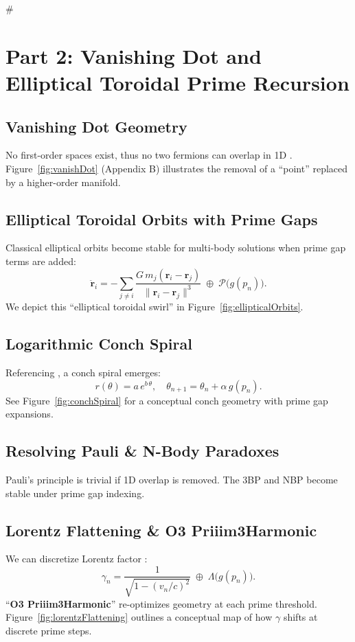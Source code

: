 #  \documentclass[11pt]{article}
\begin{document}
\section{Part 2: Vanishing Dot and Elliptical Toroidal Prime Recursion}
\label{part2}

\subsection{Vanishing Dot Geometry}
No first-order spaces exist, thus no two fermions can overlap in 1D \cite{Pauli1925}. Figure~\ref{fig:vanishDot} (Appendix B) illustrates the removal of a “point” replaced by a higher-order manifold.

\subsection{Elliptical Toroidal Orbits with Prime Gaps}
Classical elliptical orbits \cite{Newton1687} become stable for multi-body solutions when prime gap terms are added:
\[
\ddot{\mathbf{r}}_i 
= -\sum_{j \neq i} \frac{G\,m_j (\mathbf{r}_i - \mathbf{r}_j)}{\|\mathbf{r}_i - \mathbf{r}_j\|^3}
\;\oplus\;
\mathcal{P}\bigl(g(p_n)\bigr).
\]
We depict this “elliptical toroidal swirl” in Figure~\ref{fig:ellipticalOrbits}.

\subsection{Logarithmic Conch Spiral}
Referencing \cite{Hardy1979}, a conch spiral emerges:
\[
r(\theta) = a \, e^{b\,\theta}, \quad
\theta_{n+1} = \theta_n + \alpha\,g(p_n).
\]
See Figure~\ref{fig:conchSpiral} for a conceptual conch geometry with prime gap expansions.

\subsection{Resolving Pauli \& N-Body Paradoxes}
Pauli’s principle \cite{Pauli1925} is trivial if 1D overlap is removed. The 3BP \cite{Poincare1892} and NBP become stable under prime gap indexing.

\subsection{Lorentz Flattening \& O3 Priiim3Harmonic}
We can discretize Lorentz factor \cite{Lorentz1904}:
\[
\gamma_{n} 
= \frac{1}{\sqrt{1-(v_n/c)^2}} 
\;\oplus\; 
\Lambda\bigl(g(p_n)\bigr).
\]
“\textbf{O3 Priiim3Harmonic}” re-optimizes geometry at each prime threshold. Figure~\ref{fig:lorentzFlattening} outlines a conceptual map of how \(\gamma\) shifts at discrete prime steps.
\end{document}
